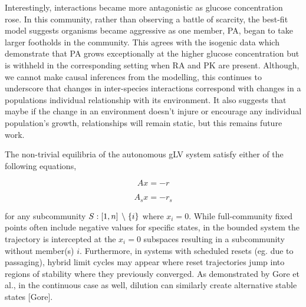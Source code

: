 \documentclass[twocolumn, 10pt]{report}
\begin{document}
{Interestingly, interactions became more antagonistic as glucose concentration rose. In this community, rather than observing a battle of scarcity, the best-fit model suggests organisms became aggressive as one member, PA, began to take larger footholds in the community. This agrees with the isogenic data which demonstrate that PA grows exceptionally at the higher glucose concentration but is withheld in the corresponding setting when RA and PK are present. Although, we cannot make causal inferences from the modelling, this continues to underscore that changes in inter-species interactions correspond with changes in a populations individual relationship with its environment. It also suggests that maybe if the change in an environment doesn't injure or encourage any individual population's growth, relationships will remain static, but this remains future work.

\indent \indent The non-trivial equilibria of the autonomous gLV system satisfy either of the following equations,

\begin{minipage}{0.42\linewidth}
    \begin{equation}
        Ax = -r \label{full_fp}
    \end{equation}
\end{minipage}%
\begin{minipage}{0.42\linewidth}
    \begin{equation}
        A_{s}x = -r_{s} \label{sub_fp}
    \end{equation}
\end{minipage}

\hspace*{1cm}

\noindent for any subcommunity $S:[1, n] \mkern7mu \backslash \mkern5mu \{i\}$ where $x_i = 0$. While full-community fixed points often include negative values for specific states, in the bounded system the trajectory is intercepted at the $x_i = 0$ subspaces resulting in a subcommunity without member(s) $i$. Furthermore, in systems with scheduled resets (eg. due to passaging), hybrid limit cycles may appear where reset trajectories jump into regions of stability where they previously converged. As demonstrated by Gore et al., in the continuous case as well, dilution can similarly create alternative stable states [Gore]. 
 
}
\end{document}
